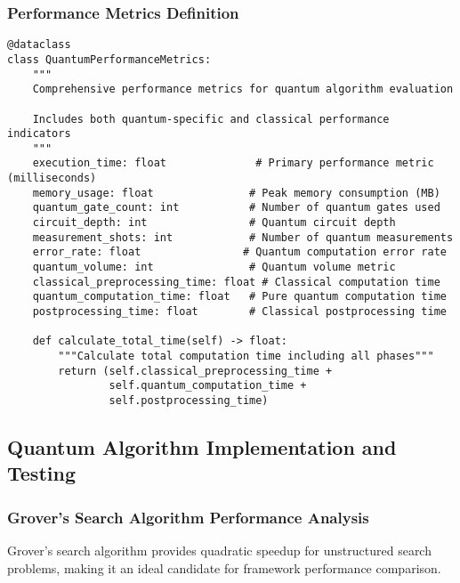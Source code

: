 \documentclass[12pt,a4paper]{report}
\begin{document}
\subsubsection{Performance Metrics Definition}

\begin{lstlisting}
@dataclass
class QuantumPerformanceMetrics:
    """
    Comprehensive performance metrics for quantum algorithm evaluation

    Includes both quantum-specific and classical performance indicators
    """
    execution_time: float              # Primary performance metric (milliseconds)
    memory_usage: float               # Peak memory consumption (MB)
    quantum_gate_count: int           # Number of quantum gates used
    circuit_depth: int                # Quantum circuit depth
    measurement_shots: int            # Number of quantum measurements
    error_rate: float                # Quantum computation error rate
    quantum_volume: int               # Quantum volume metric
    classical_preprocessing_time: float # Classical computation time
    quantum_computation_time: float   # Pure quantum computation time
    postprocessing_time: float        # Classical postprocessing time

    def calculate_total_time(self) -> float:
        """Calculate total computation time including all phases"""
        return (self.classical_preprocessing_time +
                self.quantum_computation_time +
                self.postprocessing_time)
\end{lstlisting}

\subsection{Quantum Algorithm Implementation and Testing}

\subsubsection{Grover's Search Algorithm Performance Analysis}

Grover's search algorithm provides quadratic speedup for unstructured search problems, making it an ideal candidate for framework performance comparison.
\end{document}
